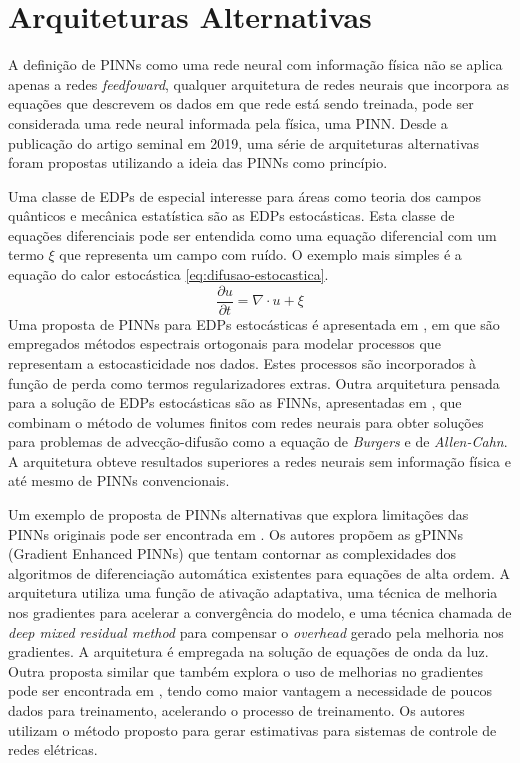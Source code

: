 \section{Arquiteturas Alternativas}

A definição de PINNs como uma rede neural com informação física não se aplica
apenas a redes \textit{feedfoward}, qualquer arquitetura de redes neurais
que incorpora as equações que descrevem os dados em que rede está sendo treinada, 
pode ser considerada uma rede neural informada pela física, uma PINN.
Desde a publicação do artigo seminal em 2019, uma série de arquiteturas 
alternativas foram propostas utilizando a ideia das PINNs como princípio.

Uma classe de EDPs de especial interesse para áreas como teoria dos campos quânticos
e mecânica estatística são as EDPs estocásticas. Esta classe de equações diferenciais
pode ser entendida como uma equação diferencial com um termo $\xi$ que representa
um campo com ruído. 
O exemplo mais simples é a equação do calor estocástica \ref{eq:difusao-estocastica}.
\begin{equation}\label{eq:difusao-estocastica}
    \frac{\partial u}{\partial t} = \nabla \cdot u + \xi
\end{equation}
Uma proposta de PINNs para EDPs estocásticas é apresentada em \cite{zhang-etal:2020-stochastic-pde-pinns},
em que são empregados métodos espectrais ortogonais para modelar processos que 
representam a estocasticidade nos dados. Estes processos são incorporados à função 
de perda como termos regularizadores extras.  
Outra arquitetura pensada para a solução de EDPs estocásticas são as FINNs,
apresentadas em \cite{karlbauer-2022-finns}, que combinam o método de volumes finitos
com redes neurais para obter soluções para problemas de advecção-difusão como a
equação de \textit{Burgers} e de \textit{Allen-Cahn}.
A arquitetura obteve resultados superiores a redes neurais sem informação física
e até mesmo de PINNs convencionais.   

Um exemplo de proposta de PINNs alternativas que explora limitações das PINNs 
originais pode ser encontrada em \cite{sun-e-feng:2023-gPINNs}.
Os autores propõem as gPINNs (Gradient Enhanced PINNs) que tentam contornar as 
complexidades dos algoritmos de diferenciação automática existentes para equações de alta 
ordem. A arquitetura utiliza uma função de ativação adaptativa, uma técnica de 
melhoria nos gradientes para acelerar a convergência do modelo, e uma técnica 
chamada de \textit{deep mixed residual method} para compensar o \textit{overhead}
gerado pela melhoria nos gradientes. A arquitetura é empregada na solução de 
equações de onda da luz.
Outra proposta similar que também explora o uso de melhorias no gradientes pode 
ser encontrada em \cite{mohammadian-etal:2023-gradient-enhanced}, tendo como
maior vantagem a necessidade de poucos dados para treinamento, acelerando o processo
de treinamento.
Os autores utilizam o método proposto para gerar estimativas para sistemas de 
controle de redes elétricas.  

